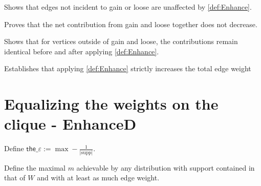 \begin{lemma}
  \label{lem:Enhance_sum_complement_unchanged}
  \leanok
  Shows that edges not incident to gain or loose are unaffected by \ref{def:Enhance}.
\end{lemma}

\begin{lemma}
  \label{lem:Enhance_edge_gainloose_increase}
  \leanok
  Proves that the net contribution from gain and loose together does not decrease.
\end{lemma}

\begin{lemma}
  \label{lem:Enhance_support_edges_same}
  \leanok
  Shows that for vertices outside of gain and loose, the contributions remain identical
  before and after applying \ref{def:Enhance}.
\end{lemma}

\begin{theorem}
  \label{thm:Enhance_total_weight_stricinc}
  \leanok
  Establishes that applying \ref{def:Enhance} strictly increases the total
  edge weight
\end{theorem}

\section{Equalizing the weights on the clique - EnhanceD}

\begin{definition}
  \label{def:the_eps}
  \leanok
  Define $\displaystyle \mathsf{the\_\varepsilon} := \max - \frac{1}{|\mathrm{supp}|}$.
\end{definition}

\begin{definition}
  \label{def:max_uniform_support}
  \leanok
  Define the maximal $m$ achievable by any distribution with support contained in that of $W$
  and with at least as much edge weight.
\end{definition}

